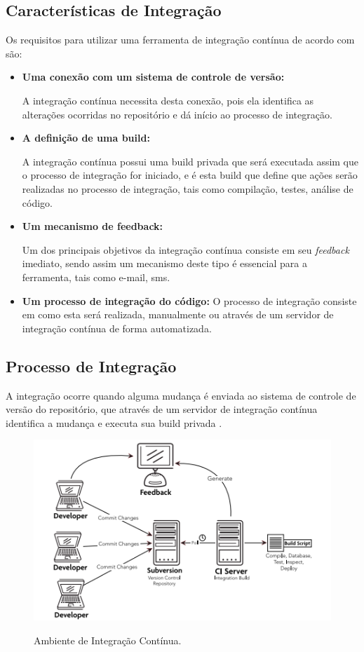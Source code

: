 \subsection{Características de Integração}
Os requisitos para utilizar uma ferramenta de integração contínua de acordo com  são:
\begin{itemize}
\item {\textbf{Uma conexão com um sistema de controle de versão:}}

A integração contínua necessita desta conexão, pois ela identifica as alterações ocorridas no repositório e dá início ao processo de integração.

\item {\textbf{A definição de uma build:}}

A integração contínua possui uma build privada que será executada assim que o processo de integração for iniciado, e é esta build que define que ações serão realizadas no processo de integração, tais como compilação, testes, análise de código.
\item {\textbf{Um mecanismo de feedback:}}

Um dos principais objetivos da integração contínua consiste em seu \textit{feedback} imediato, sendo assim um mecanismo deste tipo é essencial para a ferramenta, tais como e-mail, sms.
\item {\textbf{Um processo de integração do código: }}
O processo de integração consiste em como esta será realizada, manualmente ou através de um servidor de integração contínua de forma automatizada.

\end{itemize}

\subsection{Processo de Integração}
A integração ocorre quando alguma mudança é enviada ao sistema de controle de versão do repositório, que através de um servidor de integração contínua identifica a mudança e executa sua build privada \cite{mraz2013}. 


\begin{figure}[H]
\centering
\caption[Ambiente de Integração Contínua]{Ambiente de Integração Contínua.}
\includegraphics[scale=1.0]{./images/CI}
\label{fig:CI}
\end{figure}


